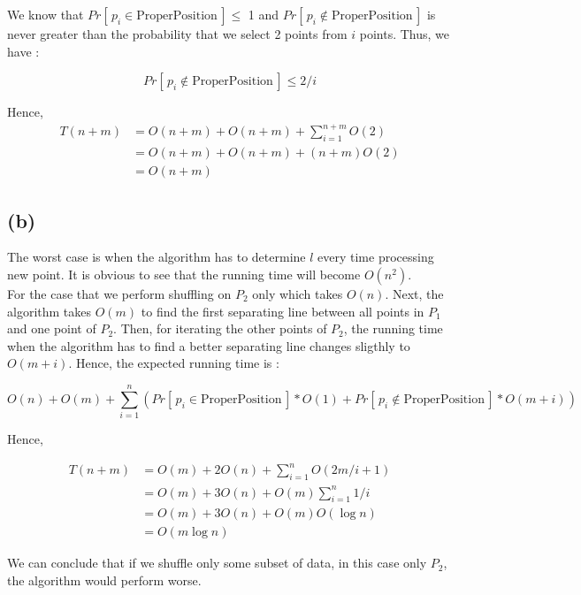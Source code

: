 We know that $Pr[\,p_i \in \text{ProperPosition}\,] \le$ 1 and $Pr[\,p_i \not\in \text{ProperPosition}\,]$
is never greater than the probability that we select 2 points from $i$ points. Thus,
we have :

$$
Pr[\,p_i \not\in \text{ProperPosition}\,] \le 2/i
$$

Hence,
\begin{align*}
T(n+m) &= O(n+m) + O(n+m) + \sum_{i=1}^{n+m}O(2) \\
&= O(n+m) + O(n+m) + (n+m)O(2) \\
&= O(n+m)
\end{align*}


\subsection*{(b)}
The worst case is when the algorithm has to determine $l$ every time processing
new point. It is obvious to see that the running time will become $O(n^2)$. \\

For the case that we perform shuffling on $P_2$ only which takes $O(n)$. Next,
the algorithm takes $O(m)$ to find the first separating line between all points in $P_1$
and one point of $P_2$. Then, for iterating the other points of $P_2$, the running
time when the algorithm has to find a better separating line changes sligthly to
$O(m+i)$. Hence, the expected running time is :

$$
O(n) + O(m) + \sum_{i=1}^{n}{ ( Pr[\,p_i \in \text{ProperPosition}\,]*O(1)
    + Pr[\,p_i \not\in \text{ProperPosition}\,]*O(m+i)
) }
$$

Hence,

\begin{align*}
T(n+m) &= O(m) + 2O(n) + \sum_{i=1}^{n}O(2m/i+1) \\
&= O(m) + 3O(n) + O(m)\sum_{i=1}^{n}1/i \\
&= O(m) + 3O(n) + O(m)O(\log{n}) \\
&= O(m\log{n})
\end{align*}

We can conclude that if we shuffle only some subset of data, in this case only $P_2$,
the algorithm would perform worse.
